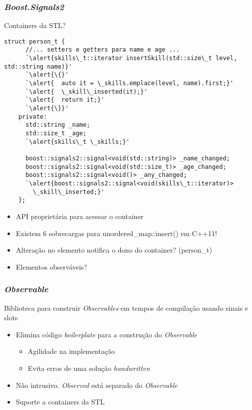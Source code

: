\documentclass[t]{beamer}
\begin{document}
\begin{frame}[fragile]
  \frametitle{\textit{Boost.Signals2}}
  Containers da STL?

  \begin{lstlisting}[basicstyle=\tiny,escapeinside=`']
    struct person_t {
      //... setters e getters para name e age ...      
      `\alert{skills\_t::iterator insertSkill(std::size\_t level, std::string name)}'
      `\alert{\{}'
      `\alert{  auto it = \_skills.emplace(level, name).first;}'
      `\alert{  \_skill\_inserted(it);}'
      `\alert{  return it;}'
      `\alert{\}}'
    private:    
      std::string _name;
      std::size_t _age;
      `\alert{skills\_t \_skills;}'

      boost::signals2::signal<void(std::string)> _name_changed;
      boost::signals2::signal<void(std::size_t)> _age_changed;
      boost::signals2::signal<void()> _any_changed;
      `\alert{boost::signals2::signal<void(skills\_t::iterator)> 
        \_skill\_inserted;}'
    };
  \end{lstlisting}

  \begin{itemize}
    \item<2->{API proprietária para acessar o container}
    \item<3->{Existem 6 sobrecargas para unordered\_map::insert() em C++11!}
    \item<4->{Alteração no elemento notifica o dono do container? (person\_t)}
    \item<5->{Elementos observáveis?}
  \end{itemize}
\end{frame}

\begin{frame}[fragile]
  \frametitle{\textit{Observable}}
  Biblioteca para construir \textit{Observables} em tempos de compilação usando sinais e slots
  \begin{itemize}
  \item<2->{Elimina código \textit{boilerplate} para a construção do \textit{Observable}}
    \begin{itemize}
    \item<3->{Agilidade na implementação}
    \item<4->{Evita erros de uma solução \textit{handwritten}}
    \end{itemize}
  \item<5->{Não intrusivo. \textit{Observed} está separado do \textit{Observable}}
  \item<6->{Suporte a containers da STL}
  \end{itemize}
\end{frame}
\end{document}
